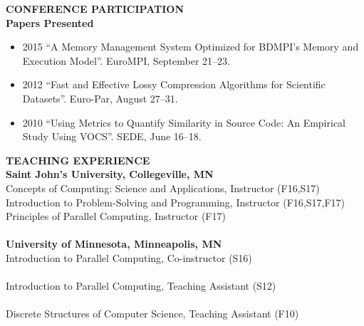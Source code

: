 \documentclass[a4paper,12pt]{article}
\newcommand{\lskip}[1]{\hspace*{1em}\\[#1\baselineskip]}
\newenvironment{Itemize}[0]{
  \vspace{-\parskip}\begin{itemize}
}{
  \end{itemize}
}
\begin{document}
\textbf{CONFERENCE PARTICIPATION}
\lskip{1}
%
\textbf{Papers Presented}
\begin{Itemize}
  \item[2015] ``A Memory Management System Optimized for BDMPI's Memory and
              Execution Model''. EuroMPI, September 21--23.

  \item[2012] ``Fast and Effective Lossy Compression Algorithms for Scientific
              Datasets''. Euro-Par, August 27--31.

  \item[2010] ``Using Metrics to Quantify Similarity in Source Code: An
              Empirical Study Using VOCS''. SEDE, June 16--18.
\end{Itemize}


\textbf{TEACHING EXPERIENCE}
\lskip{1}
%
\textbf{Saint John's University, Collegeville, MN}\\
%
Concepts of Computing: Science and Applications, Instructor (F16,S17)\\
%
Introduction to Problem-Solving and Programming, Instructor (F16,S17,F17)\\
%
Principles of Parallel Computing, Instructor (F17)\\
%
\lskip{0}
%
\textbf{University of Minnesota, Minneapolis, MN}\\
%
Introduction to Parallel Computing, Co-instructor (S16)\\
  \hspace*{1em}{\footnotesize Design and deliver weekly lectures, design and
    grade assignments, and hold office hours.}\\
%
Introduction to Parallel Computing, Teaching Assistant (S12)\\
  \hspace*{1em}{\footnotesize Gave two guest lectures, held office hours, and
    graded assignments.}\\
%
Discrete Structures of Computer Science, Teaching Assistant (F10)\\
  \hspace*{1em}{\footnotesize Lead weekly recitations, held office hours, and
    graded assignments.}%
%
%
%
%
%
%
\end{document}
